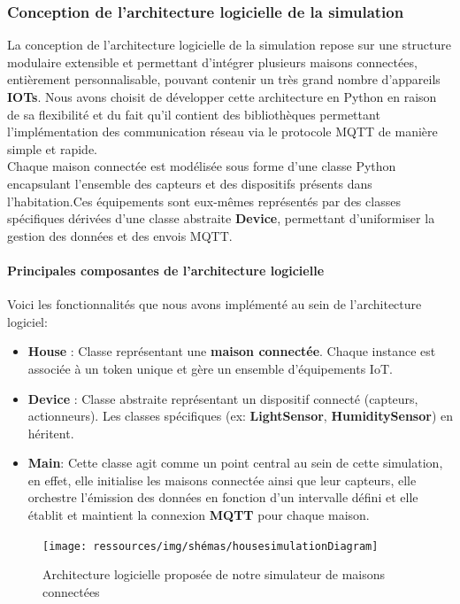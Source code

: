 \documentclass[10pt, a4paper]{report}
\begin{document}
	\subsubsection{Conception de l'architecture logicielle de la simulation}
	La conception de l'architecture logicielle de la simulation repose sur une structure modulaire extensible et permettant d'intégrer plusieurs maisons connectées, entièrement personnalisable, pouvant contenir un très grand nombre d'appareils \textbf{IOTs}. Nous avons choisit de développer cette architecture en Python en raison de sa flexibilité et du fait qu'il contient des bibliothèques permettant l'implémentation des communication réseau via le protocole MQTT de manière simple et rapide.\\
	
	Chaque maison connectée est modélisée sous forme d'une classe Python encapsulant l'ensemble des capteurs et des dispositifs présents dans l'habitation.Ces équipements sont eux-mêmes représentés par des classes spécifiques dérivées d'une classe abstraite \textbf{Device}, permettant d'uniformiser la gestion des données et des envois MQTT.\\
	
	\paragraph{Principales composantes de l'architecture logicielle}
		Voici les fonctionnalités que nous avons implémenté au sein de l'architecture logiciel:

	\begin{itemize}
		\item \textbf{House} : Classe représentant une \textbf{maison connectée}. Chaque instance est associée à un token unique et gère un ensemble d'équipements IoT.
		\item \textbf{Device} : Classe abstraite représentant un dispositif connecté (capteurs, actionneurs). Les classes spécifiques (ex: \textbf{LightSensor}, \textbf{HumiditySensor}) en héritent.
		\item \textbf{Main}: Cette classe agit comme un point central au sein de cette simulation, en effet, elle initialise les maisons connectée ainsi que leur capteurs, elle orchestre l'émission des données en fonction d'un intervalle défini et elle établit et maintient la connexion \textbf{MQTT} pour chaque maison. 
	\end{itemize}
	
	\begin{figure}[h!]
		\centering
		\texttt{[image: ressources/img/shémas/housesimulationDiagram]}
		\caption{Architecture logicielle proposée de notre simulateur de maisons connectées}
		\label{fig:archiMaisonConnectées}
	\end{figure}
	
\end{document}
